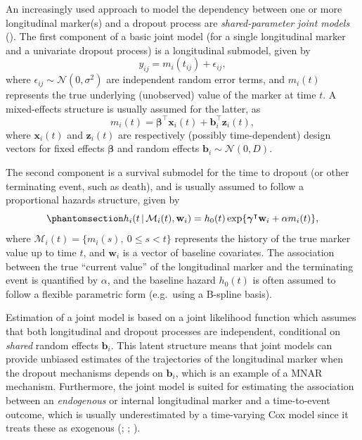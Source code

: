 \documentclass[
  letterpaper,
  paper=240mm:170mm,
  twoside=true,
  open=right,
  fontsize=10pt,
  pagesize=false,
  BCOR=15mm,
  DIV=14,
  headinclude=true,
  footinclude=false,
  headsepline=on]{scrbook}
\newcommand{\given}{\,|\,}
\begin{document}
An increasingly used approach to model the dependency between one or
more longitudinal marker(s) and a dropout process are
\emph{shared-parameter joint models}
(). The first component of a basic joint model (for a single
longitudinal marker and a univariate dropout process) is a longitudinal
submodel, given by \[
y_{ij} = m_i(t_{ij}) + \epsilon_{ij},
\] where \(\epsilon_{ij} \sim \mathcal{N}(0, \sigma^2)\) are independent
random error terms, and \(m_i(t)\) represents the true underlying
(unobserved) value of the marker at time \(t\). A mixed-effects
structure is usually assumed for the latter, as \[
m_i(t) = \boldsymbol{\beta}^\intercal \mathbf{x}_i(t) + \boldsymbol{b}_i^\intercal \mathbf{z}_i(t),
\] where \(\mathbf{x}_i(t)\) and \(\mathbf{z}_i(t)\) are respectively
(possibly time-dependent) design vectors for fixed effects
\(\boldsymbol{\beta}\) and random effects
\(\boldsymbol{b}_i \sim \mathcal{N}(0, D)\).

The second component is a survival submodel for the time to dropout (or
other terminating event, such as death), and is usually assumed to
follow a proportional hazards structure, given by
\begin{equation}\phantomsection\label{eq-current-value}{
h_i(t \given \mathcal{M}_i(t),\mathbf{w}_i) = h_0(t)\exp\{\boldsymbol{\gamma}^\intercal\mathbf{w}_i + \alpha m_i(t)\},
}\end{equation} where \(\mathcal{M}_i(t) = \{m_i(s), \ 0 \leq s < t\}\)
represents the history of the true marker value up to time \(t\), and
\(\mathbf{w}_i\) is a vector of baseline covariates. The association
between the true ``current value'' of the longitudinal marker and the
terminating event is quantified by \(\alpha\), and the baseline hazard
\(h_0(t)\) is often assumed to follow a flexible parametric form
(e.g.~using a B-spline basis).

Estimation of a joint model is based on a joint likelihood function
which assumes that both longitudinal and dropout processes are
independent, conditional on \emph{shared} random effects
\(\boldsymbol{b}_i\). This latent structure means that joint models can
provide unbiased estimates of the trajectories of the longitudinal
marker when the dropout mechanisms depends on \(\boldsymbol{b}_i\),
which is an example of a MNAR mechanism. Furthermore, the joint model is
suited for estimating the association between an \emph{endogenous} or
internal longitudinal marker and a time-to-event outcome, which is
usually underestimated by a time-varying Cox model since it treats these
as exogenous (;
;
).
\end{document}
